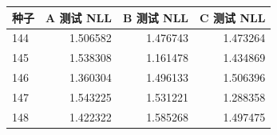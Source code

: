 \begin{center}\begin{tabular}{lrrr}\toprule
种子 & A 测试 NLL & B 测试 NLL & C 测试 NLL\\\midrule
144 & 1.506582 & 1.476743 & 1.473264 \\
145 & 1.538308 & 1.161478 & 1.434869 \\
146 & 1.360304 & 1.496133 & 1.506396 \\
147 & 1.543225 & 1.531221 & 1.288358 \\
148 & 1.422322 & 1.585268 & 1.497475 \\
\bottomrule\end{tabular}\end{center}
